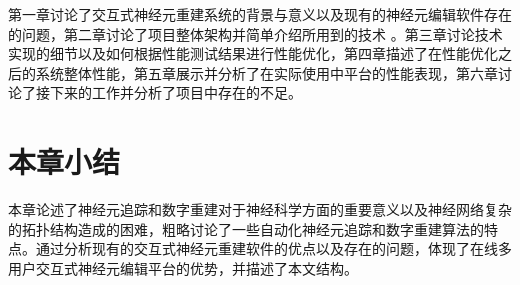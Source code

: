 第一章讨论了交互式神经元重建系统的背景与意义以及现有的神经元编辑软件存在的问题，第二章讨论了项目整体架构并简单介绍所用到的技术
。第三章讨论技术实现的细节以及如何根据性能测试结果进行性能优化，第四章描述了在性能优化之后的系统整体性能，第五章展示并分析了在实际使用中平台的性能表现，第六章讨论了接下来的工作并分析了项目中存在的不足。

\section{本章小结}
本章论述了神经元追踪和数字重建对于神经科学方面的重要意义以及神经网络复杂的拓扑结构造成的困难，粗略讨论了一些自动化神经元追踪和数字重建算法的特点。通过分析现有的交互式神经元重建软件的优点以及存在的问题，体现了在线多用户交互式神经元编辑平台的优势，并描述了本文结构。

